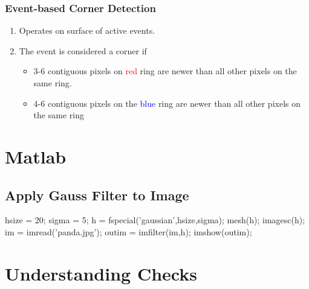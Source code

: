 \documentclass[10pt,a4paper]{scrartcl}
\begin{document}
\begin{multicols*}{2}
\subsubsection{Event-based Corner Detection}


\begin{enumerate}
\item Operates on surface of active events.
\item The event is considered a corner if
\begin{itemize}
\item 3-6 contiguous pixels on \textcolor{red}{red} ring are newer than all other pixels on the same ring.
\item 4-6 contiguous pixels on the \textcolor{blue}{blue} ring are newer than all other pixels on the same ring
\end{itemize}
\end{enumerate}

\section{Matlab}

\subsection{Apply Gauss Filter to Image}

\begin{TPMatlab}
hsize = 20;
sigma = 5;
h = fspecial('gaussian',hsize,sigma);
mesh(h); %
imagesc(h); %
im = imread('panda.jpg');
outim = imfilter(im,h);
imshow(outim);
\end{TPMatlab}

\newpage

\section*{Understanding Checks}

{

\begin{itemize}
}
{
\end{itemize}
\vspace{3ex}
}



\end{multicols*}
\end{document}
